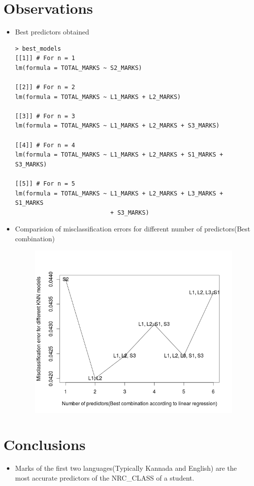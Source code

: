 \section*{Observations}
\begin{itemize}
\item Best predictors obtained
\begin{lstlisting}
> best_models
[[1]] # For n = 1
lm(formula = TOTAL_MARKS ~ S2_MARKS)

[[2]] # For n = 2
lm(formula = TOTAL_MARKS ~ L1_MARKS + L2_MARKS)

[[3]] # For n = 3
lm(formula = TOTAL_MARKS ~ L1_MARKS + L2_MARKS + S3_MARKS)

[[4]] # For n = 4
lm(formula = TOTAL_MARKS ~ L1_MARKS + L2_MARKS + S1_MARKS + S3_MARKS)

[[5]] # For n = 5
lm(formula = TOTAL_MARKS ~ L1_MARKS + L2_MARKS + L3_MARKS + S1_MARKS 
                           + S3_MARKS)
\end{lstlisting}
\item Comparision of misclassification errors for different number of predictors(Best combination)
\begin{figure}[h!]
  \centering
    \includegraphics[scale=0.5]{img/error_knn.png}
\end{figure}
\end{itemize}

\section*{Conclusions}
\begin{itemize}
\item Marks of the first two languages(Typically Kannada and English) are the most accurate predictors of the NRC{\_}CLASS of a student.
\end{itemize}
